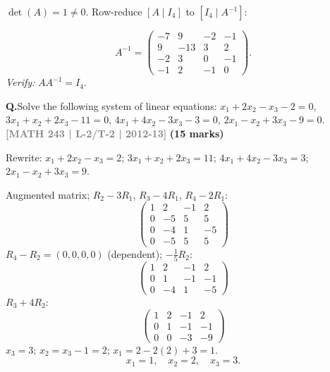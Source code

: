 \documentclass[12pt,a3paper]{article}
\newcommand{\yr}[1]{\hfill\textcolor{gray}{\small\textbf{[#1]}}}
\newcommand{\mk}[1]{\textcolor{orange!70!black}{\small\textbf{(#1 marks)}}}
\newcounter{qnum}
\newcommand{\Q}[1]{%
  \needspace{4\baselineskip}
  \refstepcounter{qnum}
  \vspace{6pt}
  \noindent\textbf{Q\theqnum.}\enspace #1\par
}
\begin{document}
\begin{tcolorbox}[enhanced,breakable,colback=cB!4,colframe=cB,
  boxrule=0.8pt,arc=5pt,
  title={\textbf{Answer --- Inverse of $A=\begin{pmatrix}1&2&3&4\\2&3&4&5\\3&4&5&5\\4&5&5&7\end{pmatrix}$}},
  fonttitle=\bfseries\color{white},colbacktitle=cB]

$\det(A)=1\neq0$. Row-reduce $[A\mid I_4]$ to $[I_4\mid A^{-1}]$:

\[
\boxed{A^{-1}=\begin{pmatrix}-7&9&-2&-1\\9&-13&3&2\\-2&3&0&-1\\-1&2&-1&0\end{pmatrix}.}
\]
\textit{Verify:} $AA^{-1}=I_4$.\;\checkmark

\end{tcolorbox}

\Q{Solve the following system of linear equations:
$x_1 + 2x_2 - x_3 - 2 = 0$, \quad $3x_1 + x_2 + 2x_3 - 11 = 0$, \quad $4x_1 + 4x_2 - 3x_3 - 3 = 0$, \quad $2x_1 - x_2 + 3x_3 - 9 = 0$.
\yr{MATH 243 | L-2/T-2 | 2012-13} \mk{15}}

\begin{tcolorbox}[enhanced,breakable,
  colback=cB!4,colframe=cB,boxrule=0.8pt,arc=5pt,
  title={\textbf{Answer --- Solve: $x_1+2x_2-x_3=2$, $3x_1+x_2+2x_3=11$, etc.}},
  fonttitle=\bfseries\color{white},colbacktitle=cB]

Rewrite: $x_1+2x_2-x_3=2$;\; $3x_1+x_2+2x_3=11$;\; $4x_1+4x_2-3x_3=3$;\; $2x_1-x_2+3x_3=9$.

Augmented matrix; $R_2-3R_1$, $R_3-4R_1$, $R_4-2R_1$:
\[
\begin{pmatrix}1&2&-1&2\\0&-5&5&5\\0&-4&1&-5\\0&-5&5&5\end{pmatrix}
\]
$R_4-R_2=(0,0,0,0)$ (dependent); $-\frac{1}{5}R_2$:
\[
\begin{pmatrix}1&2&-1&2\\0&1&-1&-1\\0&-4&1&-5\end{pmatrix}
\]
$R_3+4R_2$:
\[
\begin{pmatrix}1&2&-1&2\\0&1&-1&-1\\0&0&-3&-9\end{pmatrix}
\]
$x_3=3$; $x_2=x_3-1=2$; $x_1=2-2(2)+3=1$.
\[
\boxed{x_1=1,\quad x_2=2,\quad x_3=3.}
\]

\end{tcolorbox}
\end{document}
